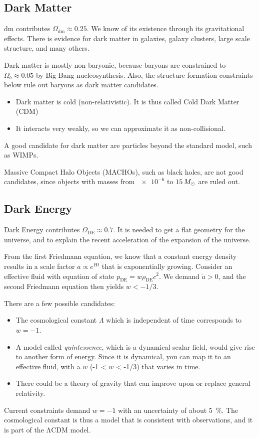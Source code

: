 \subsection*{Dark Matter}
\Ac{dm} contributes $\Omega_\text{dm} \approx 0.25$. We know of its existence through its gravitational effects. There is evidence for dark matter in galaxies, galaxy clusters, large scale structure, and many others.

Dark matter is mostly non-baryonic, because baryons are constrained to $\Omega_b \approx 0.05$ by Big Bang nucleosynthesis. Also, the structure formation constraints below rule out baryons as dark matter candidates.
\begin{itemize}
	\item Dark matter is cold (non-relativistic). It is thus called Cold Dark Matter (CDM)
	\item It interacts very weakly, so we can approximate it as non-collisional.
\end{itemize}

A good candidate for dark matter are particles beyond the standard model, such as WIMPs.

Massive Compact Halo Objects (MACHOs), such as black holes, are not good candidates, since objects with masses from $\num{e-6}$ to $15\, M_\odot$ are ruled out.

\subsection*{Dark Energy}
Dark Energy contributes $\Omega_\text{DE} \approx 0.7$. It is needed to get a flat geometry for the universe, and to explain the recent acceleration of the expansion of the universe.

From the first Friedmann equation, we know that a constant energy density results in a scale factor $a \propto e^{Ht}$ that is exponentially growing. Consider an effective fluid with equation of state $p_\text{DE} = w \rho_\text{DE} c^2$. We demand $\ddot{a} > 0$, and the second Friedmann equation then yields $w < -1/3$.

There are a few possible candidates:
\begin{itemize}
	\item The cosmological constant $\Lambda$ which is independent of time corresponds to $w=-1$.
	\item A model called \emph{quintessence}, which is a dynamical scalar field, would give rise to another form of energy. Since it is dynamical, you can map it to an effective fluid, with a $w$ (-1 < $w$ < -1/3) that varies in time.
	\item There could be a theory of gravity that can improve upon or replace general relativity.
\end{itemize}
Current constraints demand $w = -1$ with an uncertainty of about \SI{5}{\percent}. The cosmological constant is thus a model that is consistent with observations, and it is part of the ΛCDM model.

